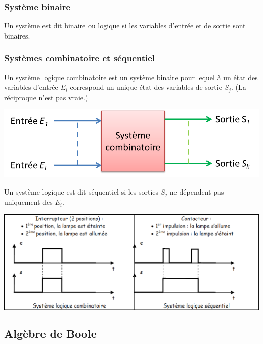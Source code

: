 \documentclass[10pt,fleqn]{article} %
\begin{document}
\subsubsection{Système binaire}

\begin{defi}
Un système est dit binaire ou logique si les variables d'entrée et de sortie sont binaires. 
\end{defi}

\subsubsection{Systèmes combinatoire et séquentiel}
\begin{defi}
Un système logique combinatoire est un système binaire pour lequel à un état des variables d'entrée $E_i$ correspond un unique état des variables de sortie $S_j$. (La réciproque n'est pas vraie.)
\end{defi}

\begin{center}
\includegraphics[width=.6\textwidth]{images/fig_08}
\end{center}

\begin{defi}
Un système logique est dit séquentiel si les sorties $S_j$ ne dépendent pas uniquement des $E_i$.
\end{defi}

\begin{exemple}
\begin{center}
\includegraphics[width=.9\textwidth]{images/fig_09}
\end{center}

\end{exemple}


\subsection{Algèbre de Boole}
\end{document}
